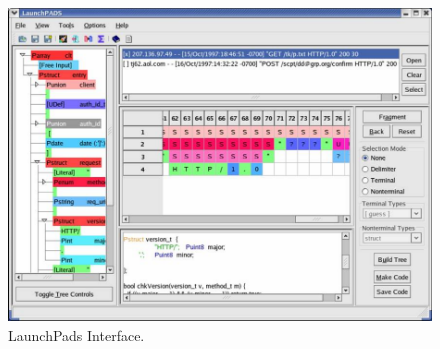 \documentclass[nocopyrightspace]{sigplanconf}
\newcommand{\kw}[1]{\tt{#1}}
\begin{document}


\begin{figure}
  \begin{center}
    \includegraphics*{launch.pdf}
  \end{center}

  \caption{\small LaunchPads Interface.}
  \label{figure:launchpads}
\end{figure}
\end{document}
